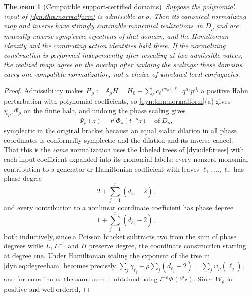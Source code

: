\documentclass[11pt,letterpaper]{article}
\newtheorem{theorem}{Theorem}[section]
\theoremstyle{definition}
\theoremstyle{remark}
\numberwithin{equation}{section}
\begin{document}
\begin{theorem}[Compatible support-certified domains]\label{dyn:thm:rescale}
Suppose the polynomial input of \cref{dyn:thm:normalform} is admissible at
$\rho$. Then its canonical normalizing map and inverse have strongly
summable monomial realizations on $D_\rho$ and are mutually inverse
symplectic bijections of that domain, and the Hamiltonian identity and the
commuting action identities hold there. If the normalizing construction is
performed independently after rescaling at two admissible values, the
realized maps agree on the overlap after undoing the scalings: these
domains carry \emph{one} compatible normalization, not a choice of
unrelated local conjugacies.
\end{theorem}
\begin{proof}
Admissibility makes
$H_\rho:=\mathscr S_\rho H
=H_0+\sum_\ell c_\ell t^{w_\rho(\ell)}q^{\alpha_\ell}p^{\beta_\ell}$
a positive Hahn perturbation with polynomial coefficients, so
\cref{dyn:thm:normalform}(a) gives $\chi_\rho,\Phi_\rho$ on the finite
halo, and undoing the phase scaling gives
\begin{equation}\label{dyn:eq:Phirescaled}
 \Psi_\rho(z)=t^{\rho}\Phi_\rho(t^{-\rho}z)\quad\text{of }D_\rho,
\end{equation}
symplectic in the original bracket because an equal scalar dilation in all
phase coordinates is conformally symplectic and the dilation and its
inverse cancel. That this is the \emph{same} normalization uses the labeled
trees of \cref{dyn:def:trees} with each input coefficient expanded into its
monomial labels: every nonzero monomial contribution to a generator or
Hamiltonian coefficient with leaves $\ell_1,\dots,\ell_r$ has phase degree
\begin{equation}\label{dyn:eq:degreeham}
 2+\sum_{j=1}^{r}(d_{\ell_j}-2),
\end{equation}
and every contribution to a nonlinear coordinate coefficient has phase
degree
\begin{equation}\label{dyn:eq:degreecoord}
 1+\sum_{j=1}^{r}(d_{\ell_j}-2),
\end{equation}
both inductively, since a Poisson bracket subtracts two from the sum of
phase degrees while $L$, $L^{-1}$ and $\Pi$ preserve degree, the coordinate
construction starting at degree one. Under Hamiltonian scaling the exponent
of the tree in \eqref{dyn:eq:degreeham} becomes precisely
$\sum_j\gamma_{\ell_j}+\rho\sum_j(d_{\ell_j}-2)=\sum_jw_\rho(\ell_j)$, and
for coordinates the same sum is obtained using
$t^{-\rho}\Phi(t^{\rho}z)$. Since $W_\rho$ is positive and well ordered,

\end{proof}
\end{document}

